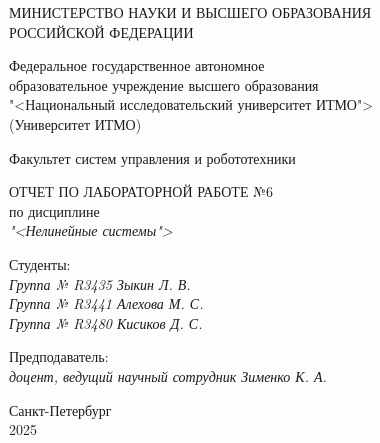 \thispagestyle{empty}

\begin{center}
    МИНИСТЕРСТВО НАУКИ И ВЫСШЕГО ОБРАЗОВАНИЯ \\ РОССИЙСКОЙ ФЕДЕРАЦИИ

    \vspace{20pt}

    Федеральное государственное автономное \\ образовательное учреждение высшего образования \\
    "<Национальный исследовательский университет ИТМО"> \\
    (Университет ИТМО)

    \vspace{20pt}

    Факультет систем управления и робототехники
\end{center}

\vfill

\begin{center}
    ОТЧЕТ ПО ЛАБОРАТОРНОЙ РАБОТЕ №6\\  
    по дисциплине \\
    \textit{"<Нелинейные системы">}

    \vspace{20pt}

\end{center}

\vfill

    \noindent Студенты: \\
    \textit{Группа № R3435 \hfill Зыкин Л. В.} \\
    \textit{Группа № R3441 \hfill Алехова М. С.} \\
    \textit{Группа № R3480 \hfill Кисиков Д. С.} \\

    \vspace{20pt}

    \noindent Предподаватель: \\
    \textit{доцент, ведущий научный сотрудник \hfill Зименко К. А.}

\vfill

\begin{center}
    Санкт-Петербург \\ 2025
\end{center}